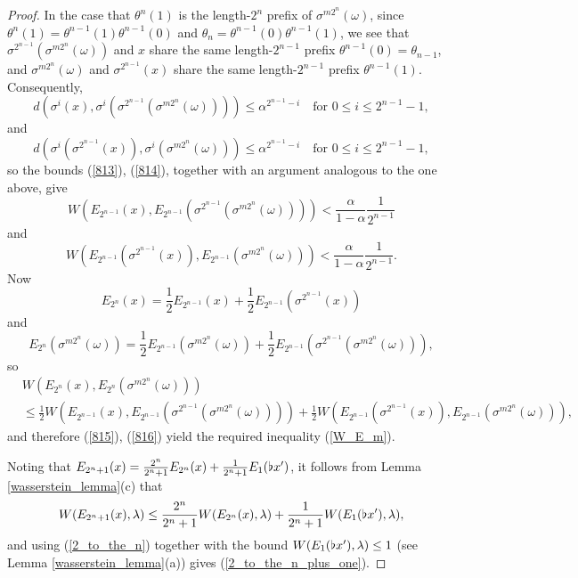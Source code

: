 \documentclass[reqno,11pt]{amsart}
\theoremstyle{definition}
\theoremstyle{remark}
\theoremstyle{remark}
\def\b{\kern 0.02em \flat \kern 0.02em}
\numberwithin{equation}{section}
\begin{document}
\begin{proof}
In the case that $\theta^n(1)$
is the length-$2^n$ prefix of
$\sigma^{m2^n}(\omega)$,
since
$\theta^n(1)=\theta^{n-1}(1)\theta^{n-1}(0)$ and $\theta_n=\theta^{n-1}(0)\theta^{n-1}(1)$,
we see that $\sigma^{2^{n-1}}(\sigma^{m2^n}(\omega))$ and $x$
share the same length-$2^{n-1}$ prefix $\theta^{n-1}(0)=\theta_{n-1}$,
and
$\sigma^{m2^n}(\omega)$ and $\sigma^{2^{n-1}}(x)$
share the same length-$2^{n-1}$ prefix $\theta^{n-1}(1)$.
Consequently,
\begin{equation}\label{813}
d\left( \sigma^i(x), \sigma^i( \sigma^{2^{n-1}}(\sigma^{m2^n}(\omega)) )\right)
\le \alpha^{2^{n-1}-i} \quad\text{for }0\le i\le 2^{n-1}-1,
\end{equation}
and
\begin{equation}\label{814}
d\left( \sigma^i(\sigma^{2^{n-1}}(x)), \sigma^i(\sigma^{m2^n}(\omega) )\right)
\le \alpha^{2^{n-1}-i} \quad\text{for }0\le i\le 2^{n-1}-1,
\end{equation}
so the bounds (\ref{813}), (\ref{814}),
together with
an argument analogous to the one above, give
\begin{equation}\label{815}
W\left(E_{2^{n-1}}(x),E_{2^{n-1}}(\sigma^{2^{n-1}}(\sigma^{m2^n}(\omega)))\right) < \frac{\alpha}{1-\alpha}\frac{1}{2^{n-1}}
\end{equation}
and
\begin{equation}\label{816}
W\left(E_{2^{n-1}}(\sigma^{2^{n-1}}(x)),
E_{2^{n-1}}(\sigma^{m2^n}(\omega))\right) 
< \frac{\alpha}{1-\alpha}\frac{1}{2^{n-1}}.
\end{equation}
Now
\begin{equation*}
E_{2^n}(x)= \frac{1}{2}E_{2^{n-1}}(x) + \frac{1}{2}E_{2^{n-1}}(\sigma^{2^{n-1}}(x))
\end{equation*}
and
\begin{equation*}
E_{2^n}(\sigma^{m2^n}(\omega))
= \frac{1}{2} E_{2^{n-1}}(\sigma^{m2^n}(\omega))
+ \frac{1}{2} E_{2^{n-1}}(\sigma^{2^{n-1}}(\sigma^{m2^n}(\omega))),
\end{equation*}
so
\begin{align*}
&W \left(E_{2^n}(x),  E_{2^n}\left(\sigma^{m2^n}(\omega)\right) \right) \\
&\le
\frac{1}{2}W\left(E_{2^{n-1}}(x),E_{2^{n-1}}(\sigma^{2^{n-1}}(\sigma^{m2^n}(\omega)))\right) 
+
\frac{1}{2} W\left(E_{2^{n-1}}(\sigma^{2^{n-1}}(x)),
E_{2^{n-1}}(\sigma^{m2^n}(\omega))\right) ,
\end{align*}
and therefore (\ref{815}), (\ref{816}) yield the required inequality (\ref{W_E_m}).

Noting that $E_{2^n+1}(x)= \frac{2^n}{2^n+1} E_{2^n}(x)+\frac{1}{2^n+1} E_1(\b x')$, it follows from Lemma 
\ref{wasserstein_lemma}(c)
 that
$$
W(E_{2^{n}+1}(x),\lambda)\le  \frac{2^n}{2^n+1} W( E_{2^n}(x),\lambda) +\frac{1}{2^n+1} W(E_1(\b x'),\lambda),$$
and using (\ref{2_to_the_n}) together with the bound $ W(E_1(\b x'),\lambda)\le 1$
(see  Lemma \ref{wasserstein_lemma}(a))
 gives
(\ref{2_to_the_n_plus_one}).
\end{proof}
\end{document}
